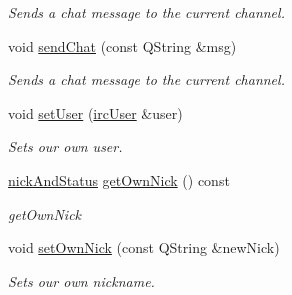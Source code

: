 \begin{DoxyCompactItemize}
\begin{DoxyCompactList}\small\item\em Sends a chat message to the current channel. \end{DoxyCompactList}\item 
void \hyperlink{classserver_1_1irc_client_a8c7ad810babb1f87de243688e1779352}{send\-Chat} (const Q\-String \&msg)
\begin{DoxyCompactList}\small\item\em Sends a chat message to the current channel. \end{DoxyCompactList}\item 
void \hyperlink{classserver_1_1irc_client_a1909d019dab9c0225b42c47928803835}{set\-User} (\hyperlink{classserver_1_1irc_user}{irc\-User} \&user)
\begin{DoxyCompactList}\small\item\em Sets our own user. \end{DoxyCompactList}\item 
\hyperlink{structserver_1_1nick_and_status}{nick\-And\-Status} \hyperlink{classserver_1_1irc_client_a210b13eb1f714bb48d84f256c8e2e8b4}{get\-Own\-Nick} () const 
\begin{DoxyCompactList}\small\item\em get\-Own\-Nick \end{DoxyCompactList}\item 
void \hyperlink{classserver_1_1irc_client_aef3233c03f42190f1c89b77c357e9f7f}{set\-Own\-Nick} (const Q\-String \&new\-Nick)
\begin{DoxyCompactList}\small\item\em Sets our own nickname. \end{DoxyCompactList}\end{DoxyCompactItemize}
